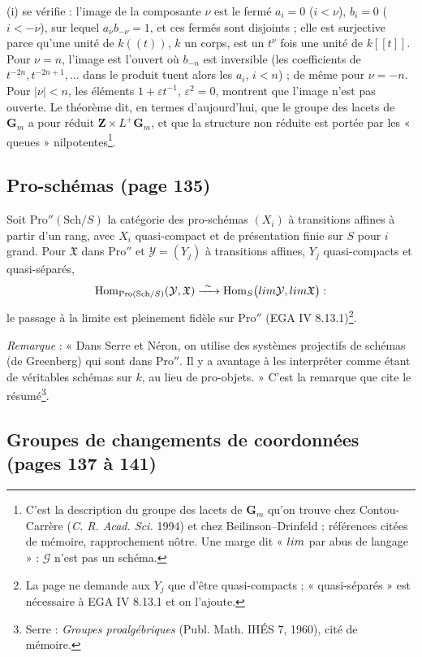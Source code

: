 \documentclass[11pt,a4paper]{article}
\begin{document}
(i) se vérifie : l'image de la composante $\nu$ est le fermé $a_i = 0$ ($i <
\nu$), $b_i = 0$ ($i < -\nu$), sur lequel $a_\nu b_{-\nu} = 1$, et ces fermés sont
disjoints ; elle est surjective parce qu'une unité de $k((t))$, $k$ un corps,
est un $t^{\nu}$ fois une unité de $k[[t]]$. Pour $\nu = n$, l'image est l'ouvert
où $b_{-n}$ est inversible (les coefficients de $t^{-2n}, t^{-2n+1}, \ldots$
dans le produit tuent alors les $a_i$, $i < n$) ; de même pour $\nu = -n$. Pour
$|\nu| < n$, les éléments $1 + \varepsilon t^{-1}$, $\varepsilon^2 = 0$, montrent
que l'image n'est pas ouverte. Le théorème dit, en termes d'aujourd'hui, que le
groupe des lacets de $\mathbf{G}_m$ a pour réduit $\mathbf{Z} \times
L^{+}\mathbf{G}_m$, et que la structure non réduite est portée par les
« queues » nilpotentes\footnote{C'est la description du groupe des lacets de
$\mathbf{G}_m$ qu'on trouve chez Contou-Carrère (\emph{C. R. Acad. Sci.} 1994) et
chez Beilinson--Drinfeld ; références citées de mémoire, rapprochement nôtre.
Une marge dit « $\varinjlim$ par abus de langage » : $\mathcal{G}$ n'est pas un
schéma.}.

\subsection*{Pro-schémas (page 135)}

Soit $\mathrm{Pro}''(\mathrm{Sch}/S)$ la catégorie des pro-schémas $(X_i)$ à
transitions affines à partir d'un rang, avec $X_i$ quasi-compact et de
présentation finie sur $S$ pour $i$ grand. Pour $\mathfrak{X}$ dans
$\mathrm{Pro}''$ et $\mathcal{Y} = (Y_j)$ à transitions affines, $Y_j$
quasi-compacts et quasi-séparés,
\[
  \mathrm{Hom}_{\mathrm{Pro}(\mathrm{Sch}/S)}(\mathcal{Y}, \mathfrak{X})
  \xrightarrow{\ \sim\ } \mathrm{Hom}_S\bigl(\varprojlim \mathcal{Y}, \varprojlim
  \mathfrak{X}\bigr) :
\]
le passage à la limite est pleinement fidèle sur $\mathrm{Pro}''$ (EGA IV
8.13.1)\footnote{La page ne demande aux $Y_j$ que d'être quasi-compacts ;
« quasi-séparés » est nécessaire à EGA IV 8.13.1 et on l'ajoute.}.

\emph{Remarque} : « Dans Serre et Néron, on utilise des systèmes projectifs de
schémas (de Greenberg) qui sont dans $\mathrm{Pro}''$. Il y a avantage à les
interpréter comme étant de véritables schémas sur $k$, au lieu de
pro-objets. » C'est la remarque que cite le résumé\footnote{Serre :
\emph{Groupes proalgébriques} (Publ. Math. IHÉS 7, 1960), cité de mémoire.}.

\subsection*{Groupes de changements de coordonnées (pages 137 à 141)}
\end{document}
